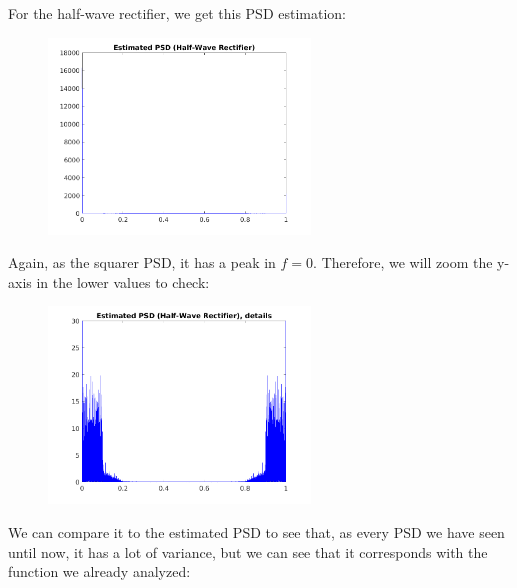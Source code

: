 \documentclass[a4paper,11pt]{article}
\begin{document}
For the half-wave rectifier, we get this PSD estimation:

\begin{figure}[!hp]
    \begin{center}
      \includegraphics[width=0.62\textwidth]{images/study3/R_es_hw.png}
    \end{center}
\end{figure}

Again, as the squarer PSD, it has a peak in $f = 0$. Therefore, we will zoom
the y-axis in the lower values to check:

\begin{figure}[!hp]
    \begin{center}
      \includegraphics[width=0.62\textwidth]{images/study3/R_es_hw_zoom.png}
    \end{center}
\end{figure}

\newpage

We can compare it to the estimated PSD to see that, as every PSD we have seen
until now, it has a lot of variance, but we can see that it corresponds with
the function we already analyzed:
\end{document}
